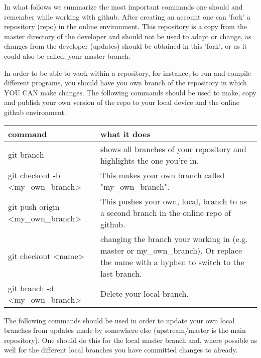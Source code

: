 \newpage
In what follows we summarize the most important commands one should and remember while working with github. 
After creating an account one can 'fork' a repository (repo) in the online environment. This repository is a 
copy from the master directory of the developer and should not be used to adapt or change, as changes from the developer (updates) should be obtained in this 'fork', or as it could also be called; your master branch. 
  
In order to be able to work within a repository, for instance, to run and compile different programs, you should have you own branch of the repository in which YOU CAN make changes. The following commands should be used to make, copy and publish your own version of the repo to your local device and the online github environment.

\begin{center}
\begin{tabular}{p{6cm}|p{9cm}}
\textbf{command} &  \textbf{what it does} \\
\hline
  git branch & shows all branches of your repository and highlights the one you're in. \\
  git checkout -b \textless my\_own\_branch\textgreater & This makes your own branch called "my\_own\_branch". \\
  git push origin \textless my\_own\_branch\textgreater & This pushes your own, local, branch to as a second branch in the online repo of github. \\
  git checkout \textless name\textgreater & changing the branch your working in (e.g. master or my\_own\_branch). Or replace the name with a hyphen to switch to the last branch.\\
  git branch -d \textless my\_own\_branch\textgreater & Delete your local branch. \\
  \end{tabular}
\end{center}

  The following commands should be used in order to update your own local branches from updates made by somewhere else (upstream/master is the main repository). One should do this for the local master branch and, where possible as well for the different local branches you have committed changes to already. 

